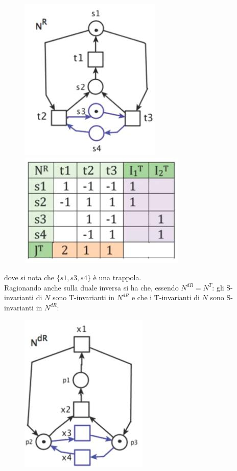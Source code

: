 \documentclass[a4paper,12pt, oneside]{book}
\begin{document}
\begin{esempio}
  \begin{figure}[H]
    \centering
    \includegraphics[scale = 0.4]{img/dr11.jpg}
    \includegraphics[scale = 0.5]{img/dr12.jpg}
  \end{figure}
  dove si nota che $\{s1,s3,s4\}$ è una trappola.\\
  Ragionando anche sulla duale inversa si ha che, essendo $N^{dR}=N^T$:
  gli S-invarianti di $N$ sono T-invarianti in $N^{dR}$ e che i T-invarianti di
  $N$ sono S-invarianti in $N^{dR}$:
  \begin{figure}[H]
    \centering
    \includegraphics[scale = 0.4]{img/dr13.jpg}

\end{figure}
\end{esempio}
\end{document}
